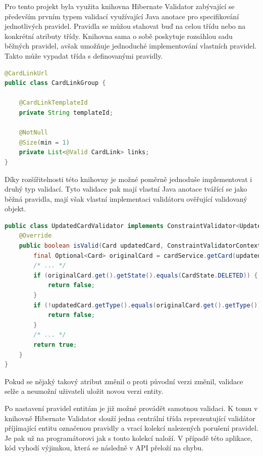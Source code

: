 		Pro tento projekt byla využita knihovna Hibernate Validator zabývající se především prvním typem validací
		využívající Java anotace pro specifikování jednotlivých pravidel.
		Pravidla se můžou stahovat buď na celou třídu nebo na konkrétní atributy třídy.
		Knihovna sama o sobě poskytuje rozsáhlou sadu běžných pravidel, avšak umožňuje jednoduché implementování vlastních
		pravidel.
		Takto může vypadat třída s definovanými pravidly.

		\begin{lstlisting}[language=Java, caption={Ukázka třídy s validačními pravidly pomocí Java anotací. Zdroj: [autor]}]
@CardLinkUrl
public class CardLinkGroup {

	@CardLinkTemplateId
	private String templateId;

	@NotNull
	@Size(min = 1)
	private List<@Valid CardLink> links;
}
		\end{lstlisting}

		Díky rozšířitelnosti této knihovny je možné poměrně jednoduše implementovat i druhý typ validací.
		Tyto validace pak mají vlastní Java anotace tvářící se jako běžná pravidla, mají však vlastní implementaci
		validátoru ověřující validovaný objekt.

		\begin{lstlisting}[language=Java, caption={kázka validátoru ověřující neměnitelné atributy upravené karty oproti její původní verzi. Zdroj: [autor]}]
public class UpdatedCardValidator implements ConstraintValidator<UpdatedCard, Card> {
	@Override
	public boolean isValid(Card updatedCard, ConstraintValidatorContext context) {
		final Optional<Card> originalCard = cardService.getCard(updatedCard.getId(), true);
		/* ... */
		if (originalCard.get().getState().equals(CardState.DELETED)) {
			return false;
		}
		if (!updatedCard.getType().equals(originalCard.get().getType())) {
			return false;
		}
		/* ... */
		return true;
	}
}
		\end{lstlisting}

		Pokud se nějaký takový atribut změnil o proti původní verzi změnil, validace selže a neumožní uživateli
		uložit novou verzi entity.

		Po nastavení pravidel entitám je již možné provádět samotnou validaci.
		K tomu v knihovně Hibernate Validator slouží jedna centrální třída reprezentující validátor příjímající
		entitu označenou pravidly a vrací kolekcí nalezených porušení pravidel.
		Je pak už na programátorovi jak s touto kolekcí naloží.
		V případě této aplikace, kód vyhodí výjimkou, která se následně v \ac{API} přeloží na chybu.

